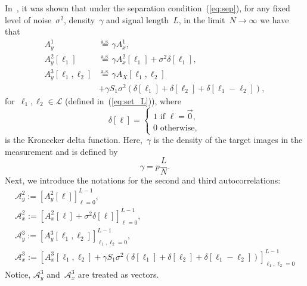 \documentclass{article}
\newcommand{\asafc}[1]{{\color{blue}{[Asaf: #1]}}}
\newcommand{\A}[0]{\mathcal{A}}
\begin{document}
In~\cite{bendory2019multi}, it was shown that under the separation condition~(\ref{eq:sep}), for any fixed level of noise~$\sigma^2$, density~$\gamma$ and signal length~$L$, in the limit~\mbox{$N \rightarrow \infty$} we have that
\begin{align}
\label{eq:well_separated_1st}
A_{y}^1 &\stackrel{\text{a.s.}}{=} \gamma A_{x}^1, \\
\label{eq:well_separated_2nd}
A_{y}^2 [\ell_1] &\stackrel{\text{a.s.}}{=} \gamma A_{x}^2 [\ell_1] + \sigma^2\delta[\ell_1], \\
\label{eq:well_separated_3rd}
A_{y}^3 [\ell_1, \ell_2] &\stackrel{\text{a.s.}}{=} \gamma A_{X} [\ell_1, \ell_2] \nonumber \\&+ \gamma S_1 \sigma^2 (\delta[\ell_1] + \delta[\ell_2] + \delta[\ell_1 - \ell_2]),
\end{align}
\asafc{What is $S_1$ above?}
for~$\ell_1, \ell_2 \in \mathcal{L}$ (defined in~(\ref{eq:set_L})), where
\begin{equation}
\label{eq:delta}
\delta[\ell] = \begin{cases} 1 \text{ if } \ell = \vec{0}, \\ 0 \text{ otherwise}, \end{cases}
\end{equation}
is the Kronecker delta function. Here,~$\gamma$ is the density of the target images in the measurement and is defined by
\begin{equation}
\label{eq:gamma}
\gamma = p \frac{L}{N}.
\end{equation}
Next, we introduce the notations for the second and third autocorrelations:
\begin{gather*}
	 \A_y^2 := [A_y^2[\ell
	] ]_{\ell=0}^{L-1},
	\\
	\A_x^2 := [A_x^2[\ell
	]+ \sigma^2 \delta[\ell]]_{\ell=0}^{L-1},
	\\
	\A_y^3 := [A_y^3[\ell_1, \ell_2]]_{\ell_1,\ell_2=0}^{L-1},
	\\
	\A_x^3 := [A_x^3[\ell_1, \ell_2] + \gamma S_1 \sigma^2 (\delta[\ell_1] + \delta[\ell_2] + \delta[\ell_1 - \ell_2])]_{\ell_1,\ell_2=0}^{L-1}
\end{gather*}
Notice, $\A_y^3$ and~$\A_x^3$ are treated as vectors.
\end{document}

